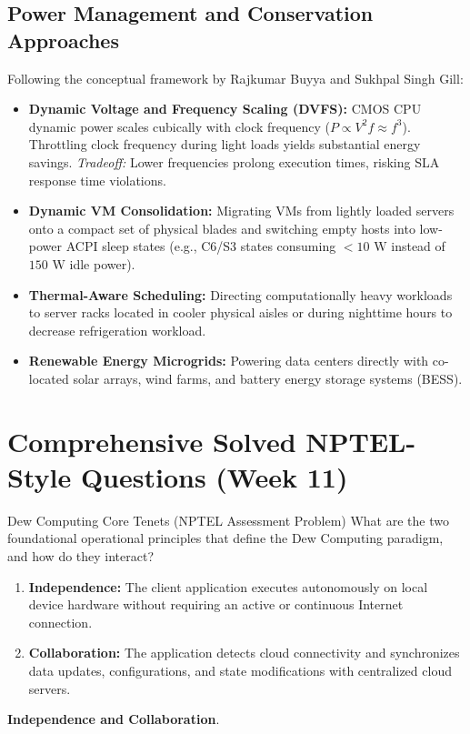 \subsection{Power Management and Conservation Approaches}
Following the conceptual framework by Rajkumar Buyya and Sukhpal Singh Gill:
\begin{itemize}[leftmargin=*]
  \item \textbf{Dynamic Voltage and Frequency Scaling (DVFS):} CMOS CPU dynamic power scales cubically with clock frequency ($P \propto V^2 f \approx f^3$). Throttling clock frequency during light loads yields substantial energy savings. \emph{Tradeoff:} Lower frequencies prolong execution times, risking SLA response time violations.
  \item \textbf{Dynamic VM Consolidation:} Migrating VMs from lightly loaded servers onto a compact set of physical blades and switching empty hosts into low-power ACPI sleep states (e.g., C6/S3 states consuming $<10\text{ W}$ instead of $150\text{ W}$ idle power).
  \item \textbf{Thermal-Aware Scheduling:} Directing computationally heavy workloads to server racks located in cooler physical aisles or during nighttime hours to decrease refrigeration workload.
  \item \textbf{Renewable Energy Microgrids:} Powering data centers directly with co-located solar arrays, wind farms, and battery energy storage systems (BESS).
\end{itemize}

\section{Comprehensive Solved NPTEL-Style Questions (Week 11)}

\begin{solved}{Dew Computing Core Tenets (NPTEL Assessment Problem)}
\Given What are the two foundational operational principles that define the Dew Computing paradigm, and how do they interact?
\Steps
\begin{enumerate}[leftmargin=*]
  \item \textbf{Independence:} The client application executes autonomously on local device hardware without requiring an active or continuous Internet connection.
  \item \textbf{Collaboration:} The application detects cloud connectivity and synchronizes data updates, configurations, and state modifications with centralized cloud servers.
\end{enumerate}
\Answer \textbf{Independence and Collaboration}.
\end{solved}


